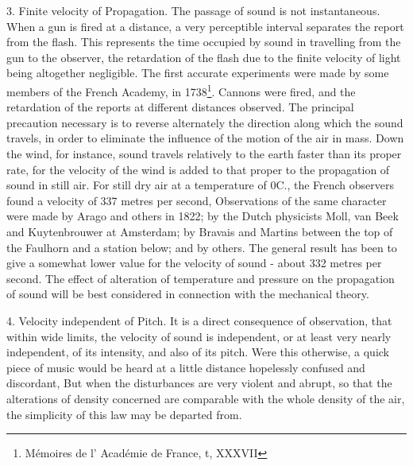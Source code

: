 3. Finite velocity of Propagation.  The passage of sound is not instantaneous.
When a gun is fired at a distance, a very perceptible interval separates the
report from the flash. This represents the time occupied by sound in travelling
from the gun to the observer, the retardation of the flash due to the finite
velocity of light being altogether negligible. The first accurate experiments
were made by some members of the French Academy, in 1738\footnote{Mémoires de
l' Académie de France, t, XXXVII}. Cannons were fired, and the retardation of
the reports at different distances observed. The principal precaution necessary
is to reverse alternately the direction along which the sound travels, in order
to eliminate the influence of the motion of the air in mass. Down the wind, for
instance, sound travels relatively to the earth faster than its proper rate,
for the velocity of the wind is added to that proper to the propagation of
sound in still air. For still dry air at a temperature of 0C., the French
observers found a velocity of 337 metres per second, Observations of the same
character were made by Arago and others in 1822; by the Dutch physicists Moll,
van Beek and Kuytenbrouwer at Amsterdam; by Bravais and Martins between the top
of the Faulhorn and a station below; and by others. The general result has been
to give a somewhat lower value for the velocity of sound - about 332 metres per
second. The effect of alteration of temperature and pressure on the propagation
of sound will be best considered in connection with the mechanical theory.

4.  Velocity independent of Pitch.  It is a direct consequence of observation,
that within wide limits, the velocity of sound is independent, or at least very
nearly independent, of its intensity, and also of its pitch. Were this
otherwise, a quick piece of music would be heard at a little distance
hopelessly confused and discordant, But when the disturbances are very violent
and abrupt, so that the alterations of density concerned are comparable with
the whole density of the air, the simplicity of this law may be departed from.

